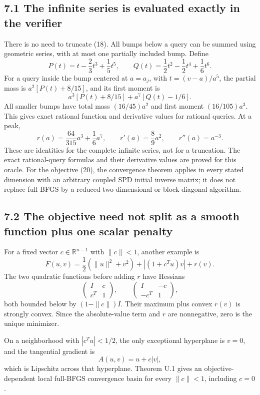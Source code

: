 \subsection{7.1 The infinite series is evaluated exactly in the
verifier}\label{U:the-infinite-series-is-evaluated-exactly-in-the-verifier}

There is no need to truncate (18). All bumps below a query can be summed
using geometric series, with at most one partially included bump. Define
\[
 P(t)=t-\frac23t^3+\frac15t^5,\qquad
 Q(t)=\frac12t^2-\frac12t^4+\frac16t^6.
\] For a query inside the bump centered at \(a=a_j\), with
\(t=(v-a)/a^5\), the partial mass is \(a^2[P(t)+8/15]\), and its first
moment is \[
 a^3[P(t)+8/15]+a^7[Q(t)-1/6].
\] All smaller bumps have total mass \((16/45)a^2\) and first moment
\((16/105)a^3\). This gives exact rational function and derivative
values for rational queries. At a peak, \[
 r(a)=\frac{64}{315}a^3+\frac16a^7,\qquad
 r'(a)=\frac89a^2,\qquad r''(a)=a^{-3}.
\] These are identities for the complete infinite series, not for a truncation. The exact rational-query formulas and their derivative values are proved for this oracle. For the objective (20), the convergence theorem applies in every stated dimension with an arbitrary coupled SPD initial inverse matrix; it does not replace full BFGS by a reduced two-dimensional or block-diagonal algorithm.

\subsection{7.2 The objective need not split as a smooth function plus
one scalar
penalty}\label{U:the-objective-need-not-split-as-a-smooth-function-plus-one-scalar-penalty}

For a fixed vector \(c\in\mathbb R^{n-1}\) with \(\|c\|<1\), another
example is \[
 F(u,v)=\frac12(\|u\|^2+v^2)+|(1+c^Tu)v|+r(v).
\] The two quadratic functions before adding \(r\) have Hessians \[
 \begin{pmatrix}I&c\\c^T&1\end{pmatrix},\qquad
 \begin{pmatrix}I&-c\\-c^T&1\end{pmatrix},
\] both bounded below by \((1-\|c\|)I\). Their maximum plus convex
\(r(v)\) is strongly convex. Since the absolute-value term and \(r\) are
nonnegative, zero is the unique minimizer.

On a neighborhood with \(|c^Tu|<1/2\), the only exceptional hyperplane
is \(v=0\), and the tangential gradient is \[
 A(u,v)=u+c|v|,
\] which is Lipschitz across that hyperplane. Theorem U.1 gives an objective-dependent local full-BFGS convergence basin for every $\|c\|<1$, including $c=0$.

